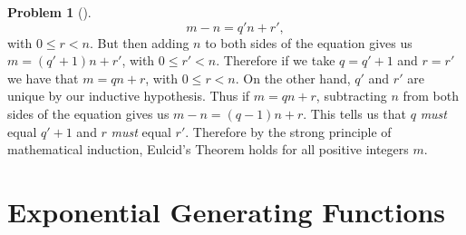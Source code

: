 \documentclass[10pt,]{book}
\theoremstyle{plain}
\theoremstyle{definition}
\newtheorem{activity}[project]{Problem}
\theoremstyle{definition}
\numberwithin{equation}{chapter}
\newcommand{\lt}{<}
\begin{document}
\begin{activity}[]
\begin{equation*}
m-n = q'n+r',
\end{equation*}
with \(0 \le r \lt n\).  But then adding \(n\) to both sides of the equation gives us \(m = (q'+1)n + r'\), with \(0 \le r' \lt n\).  Therefore if we take \(q = q'+1\) and \(r = r'\) we have that \(m = qn+r\), with \(0 \le r \lt n\).  On the other hand, \(q'\) and \(r'\) are unique by our inductive hypothesis.  Thus if \(m = qn + r\), subtracting \(n\) from both sides of the equation gives us \(m-n = (q-1)n+r\). This tells us that \(q\) \emph{must} equal \(q'+1\) and \(r\) \emph{must} equal \(r'\).  Therefore by the strong principle of mathematical induction, Eulcid's Theorem holds for all positive integers \(m\).%
\end{activity}
\typeout{************************************************}
\typeout{************************************************}
\chapter[{Exponential Generating Functions}]{Exponential Generating Functions}\label{expogenfun}
\typeout{************************************************}
\typeout{************************************************}
\end{document}
